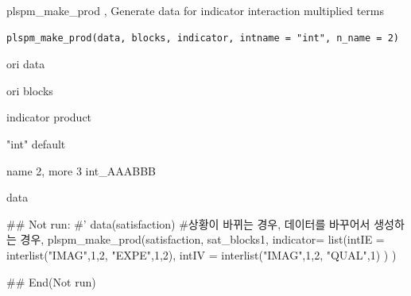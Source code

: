 \documentclass[a4paper]{book}
\begin{document}
%
\begin{Description}
plspm\_make\_prod , Generate data for indicator interaction multiplied terms
\end{Description}
%
\begin{Usage}
\begin{verbatim}
plspm_make_prod(data, blocks, indicator, intname = "int", n_name = 2)
\end{verbatim}
\end{Usage}
%
\begin{Arguments}
\begin{ldescription}
\item[\code{data}] ori data

\item[\code{blocks}] ori blocks

\item[\code{indicator}] indicator product

\item[\code{intname}] "int" default

\item[\code{n\_name}] name 2, more 3  int\_AAABBB
\end{ldescription}
\end{Arguments}
%
\begin{Value}
data
\end{Value}
%
\begin{Examples}
\begin{ExampleCode}

\#\# Not run: 
#' data(satisfaction)
#상황이 바뀌는 경우, 데이터를 바꾸어서 생성하는 경우,
plspm_make_prod(satisfaction,
                sat_blocks1,
                indicator= list(intIE = interlist("IMAG",1,2, "EXPE",1,2),
                                intIV = interlist("IMAG",1,2, "QUAL",1)  )
) %

## End(Not run)

\end{ExampleCode}
\end{Examples}
\end{document}
